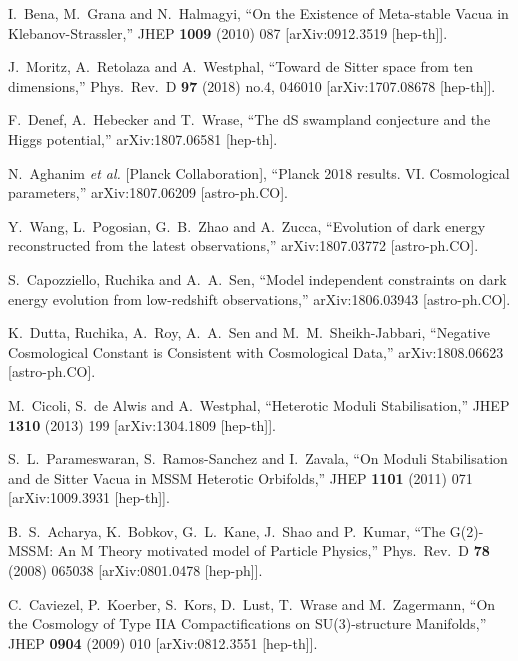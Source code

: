 \documentclass[11pt,a4paper]{article}
\begin{document}
\begin{itemize}
\begin{thebibliography}{99}
  I.~Bena, M.~Grana and N.~Halmagyi,
  ``On the Existence of Meta-stable Vacua in Klebanov-Strassler,''
  JHEP {\bf 1009} (2010) 087
  [arXiv:0912.3519 [hep-th]].

  J.~Moritz, A.~Retolaza and A.~Westphal,
  ``Toward de Sitter space from ten dimensions,''
  Phys.\ Rev.\ D {\bf 97} (2018) no.4,  046010
  [arXiv:1707.08678 [hep-th]].

  F.~Denef, A.~Hebecker and T.~Wrase,
  ``The dS swampland conjecture and the Higgs potential,''
  arXiv:1807.06581 [hep-th].

  N.~Aghanim {\it et al.} [Planck Collaboration],
  ``Planck 2018 results. VI. Cosmological parameters,''
  arXiv:1807.06209 [astro-ph.CO].

  Y.~Wang, L.~Pogosian, G.~B.~Zhao and A.~Zucca,
  ``Evolution of dark energy reconstructed from the latest observations,''
  arXiv:1807.03772 [astro-ph.CO].

  S.~Capozziello, Ruchika and A.~A.~Sen,
  ``Model independent constraints on dark energy evolution from low-redshift observations,''
  arXiv:1806.03943 [astro-ph.CO].

  K.~Dutta, Ruchika, A.~Roy, A.~A.~Sen and M.~M.~Sheikh-Jabbari,
  ``Negative Cosmological Constant is Consistent with Cosmological Data,''
  arXiv:1808.06623 [astro-ph.CO].

  M.~Cicoli, S.~de Alwis and A.~Westphal,
  ``Heterotic Moduli Stabilisation,''
  JHEP {\bf 1310} (2013) 199
  [arXiv:1304.1809 [hep-th]].
  
  S.~L.~Parameswaran, S.~Ramos-Sanchez and I.~Zavala,
  ``On Moduli Stabilisation and de Sitter Vacua in MSSM Heterotic Orbifolds,''
  JHEP {\bf 1101} (2011) 071
  [arXiv:1009.3931 [hep-th]].
  
  B.~S.~Acharya, K.~Bobkov, G.~L.~Kane, J.~Shao and P.~Kumar,
  ``The G(2)-MSSM: An M Theory motivated model of Particle Physics,''
  Phys.\ Rev.\ D {\bf 78} (2008) 065038
  [arXiv:0801.0478 [hep-ph]].	
		
  C.~Caviezel, P.~Koerber, S.~Kors, D.~Lust, T.~Wrase and M.~Zagermann,
  ``On the Cosmology of Type IIA Compactifications on SU(3)-structure Manifolds,''
  JHEP {\bf 0904} (2009) 010
  [arXiv:0812.3551 [hep-th]].
	

\end{thebibliography}
\end{itemize}
\end{document}
